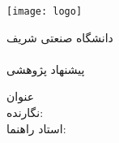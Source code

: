 \begin{center}
\thispagestyle{empty}
\texttt{[image: logo]} \\
\begin{Large}
دانشگاه صنعتی شریف \\
\fadepart \\ [1cm]
پیشنهاد پژوهشی \falevel \\

\end{Large}
\vskip 3cm
\large{عنوان}  \\ \textbf{\large{\fatitle}}
\vskip 2cm
\large{نگارنده:} \\ \Large{\faAuthor}
\vskip 2cm
\large{استاد راهنما:} \\ \Large{\fasupervisor}
\vskip 2cm
\large{\fadate}
\end{center}

